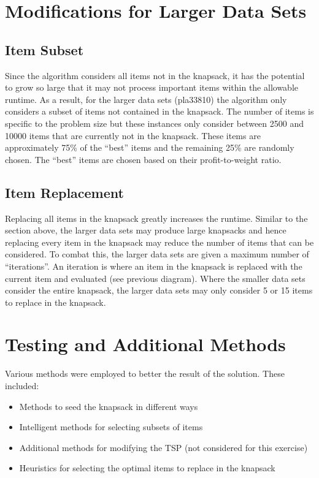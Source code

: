 \documentclass[a4paper,12pt]{article}
\begin{document}
\newpage
\section{Modifications for Larger Data Sets}
\subsection{Item Subset}
Since the algorithm considers all items not in the knapsack, it has the potential to grow so large that it may not process important items within the allowable runtime. As a result, for the larger data sets (pla33810) the algorithm only considers a subset of items not contained in the knapsack. The number of items is specific to the problem size but these instances only consider between 2500 and 10000 items that are currently not in the knapsack. These items are approximately 75\% of the ``best'' items and the remaining 25\% are randomly chosen. The ``best'' items are chosen based on their profit-to-weight ratio.

\subsection{Item Replacement}
Replacing all items in the knapsack greatly increases the runtime. Similar to the section above, the larger data sets may produce large knapsacks and hence replacing every item in the knapsack may reduce the number of items that can be considered. To combat this, the larger data sets are given a maximum number of ``iterations''. An iteration is where an item in the knapsack is replaced with the current item and evaluated (see previous diagram). Where the smaller data sets consider the entire knapsack, the larger data sets may only consider 5 or 15 items to replace in the knapsack. 

\section{Testing and Additional Methods}
Various methods were employed to better the result of the solution. These included:
\begin{itemize}
	\item Methods to seed the knapsack in different ways
	\item Intelligent methods for selecting subsets of items
	\item Additional methods for modifying the TSP (not considered for this exercise)
	\item Heuristics for selecting the optimal items to replace in the knapsack
\end{itemize}
\end{document}
